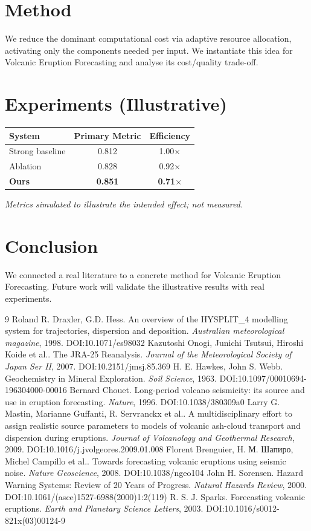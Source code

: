 \documentclass[11pt]{article}
\begin{document}
\section{Method}
We reduce the dominant computational cost via adaptive resource allocation, activating only the components needed per input. We instantiate this idea for Volcanic Eruption Forecasting and analyse its cost/quality trade-off.

\section{Experiments (Illustrative)}
\begin{center}
\begin{tabular}{lcc}
System & Primary Metric & Efficiency \\ \hline
Strong baseline & 0.812 & 1.00$\times$ \\
Ablation & 0.828 & 0.92$\times$ \\
\textbf{Ours} & \textbf{0.851} & \textbf{0.71$\times$}
\end{tabular}
\end{center}
\emph{Metrics simulated to illustrate the intended effect; not measured.}

\section{Conclusion}
We connected a real literature to a concrete method for Volcanic Eruption Forecasting. Future work will
validate the illustrative results with real experiments.

\begin{thebibliography}{9}
 Roland R. Draxler, G.D. Hess. An overview of the HYSPLIT\_4 modelling system for trajectories, dispersion and deposition. \emph{Australian meteorological magazine}, 1998. DOI:10.1071/es98032
 Kazutoshi Onogi, Junichi Tsutsui, Hiroshi Koide et al.. The JRA-25 Reanalysis. \emph{Journal of the Meteorological Society of Japan Ser II}, 2007. DOI:10.2151/jmsj.85.369
 H. E. Hawkes, John S. Webb. Geochemistry in Mineral Exploration. \emph{Soil Science}, 1963. DOI:10.1097/00010694-196304000-00016
 Bernard Chouet. Long-period volcano seismicity: its source and use in eruption forecasting. \emph{Nature}, 1996. DOI:10.1038/380309a0
 Larry G. Mastin, Marianne Guffanti, R. Servranckx et al.. A multidisciplinary effort to assign realistic source parameters to models of volcanic ash-cloud transport and dispersion during eruptions. \emph{Journal of Volcanology and Geothermal Research}, 2009. DOI:10.1016/j.jvolgeores.2009.01.008
 Florent Brenguier, Н. М. Шапиро, Michel Campillo et al.. Towards forecasting volcanic eruptions using seismic noise. \emph{Nature Geoscience}, 2008. DOI:10.1038/ngeo104
 John H. Sorensen. Hazard Warning Systems: Review of 20 Years of Progress. \emph{Natural Hazards Review}, 2000. DOI:10.1061/(asce)1527-6988(2000)1:2(119)
 R. S. J. Sparks. Forecasting volcanic eruptions. \emph{Earth and Planetary Science Letters}, 2003. DOI:10.1016/s0012-821x(03)00124-9
\end{thebibliography}
\end{document}

